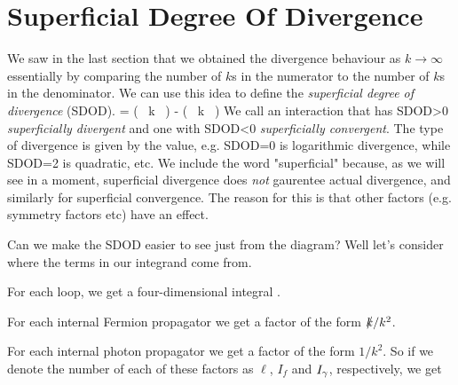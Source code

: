 \section{Superficial Degree Of Divergence}

We saw in the last section that we obtained the divergence behaviour as $k\to\infty$ essentially by comparing the number of $k$s in the numerator to the number of $k$s in the denominator. We can use this idea to define the \textit{superficial degree of divergence} (SDOD).
\bse 
     = ( \, k \, ) - ( \, k \, )
\ese 
We call an interaction that has SDOD>0 \textit{superficially divergent} and one with SDOD<0 \textit{superficially convergent}. The type of divergence is given by the value, e.g. SDOD=0 is logarithmic divergence, while SDOD=2 is quadratic, etc. We include the word "superficial" because, as we will see in a moment, superficial divergence does \textit{not} gaurentee actual divergence, and similarly for superficial convergence. The reason for this is that other factors (e.g. symmetry factors etc) have an effect.

Can we make the SDOD easier to see just from the diagram? Well let's consider where the terms in our integrand come from.
\ben[label=(\roman*)]
    \item For each loop, we get a four-dimensional integral 
    \bse 
        \int {}.
    \ese 
    \item For each internal Fermion propagator we get a factor of the form $\slashed{k}/k^2$. 
    \item For each internal photon propagator we get a factor of the form $1/k^2$.
\een 
So if we denote the number of each of these factors as $\ell$, $I_f$ and $I_{\gamma}$, respectively, we get 

